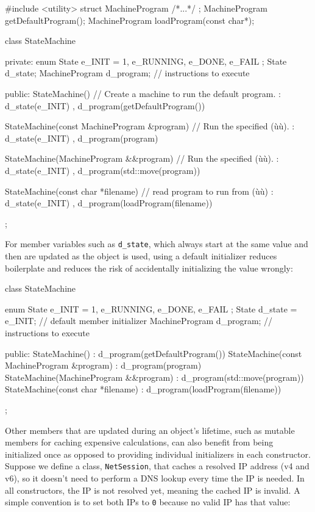 \begin{emcppshiddenlisting}[emcppsbatch={e3,e4}]
#include <utility>
struct MachineProgram { /*...*/ };
MachineProgram getDefaultProgram();
MachineProgram loadProgram(const char*);
\end{emcppshiddenlisting}
\begin{emcppslisting}[emcppsbatch=e3]
class StateMachine
{
private:
    enum State { e_INIT = 1, e_RUNNING, e_DONE, e_FAIL };
    State          d_state;
    MachineProgram d_program;  // instructions to execute

public:
    StateMachine()  // Create a machine to run the default program.
    : d_state(e_INIT)
    , d_program(getDefaultProgram())
    { }

    StateMachine(const MachineProgram &program)  // Run the specified (ù{}ù).
    : d_state(e_INIT)
    , d_program(program)
    { }

    StateMachine(MachineProgram &&program)  // Run the specified (ù{}ù).
    : d_state(e_INIT)
    , d_program(std::move(program))
    { }

    StateMachine(const char *filename)  // read program to run from (ù{}ù)
    : d_state(e_INIT)
    , d_program(loadProgram(filename))
    { }
};
\end{emcppslisting}
    

For member variables such as \lstinline!d_state!, which always start at
the same value and then are updated as the object is used, using a
default initializer reduces boilerplate and reduces the risk of
accidentally initializing the value wrongly:

\begin{emcppslisting}[emcppsbatch=e4]
class StateMachine
{
    enum State { e_INIT = 1, e_RUNNING, e_DONE, e_FAIL };
    State          d_state = e_INIT;  // default member initializer
    MachineProgram d_program;         // instructions to execute

public:
    StateMachine() : d_program(getDefaultProgram()) { }
    StateMachine(const MachineProgram &program) : d_program(program) { }
    StateMachine(MachineProgram &&program) : d_program(std::move(program)) { }
    StateMachine(const char *filename) : d_program(loadProgram(filename)) { }
};
\end{emcppslisting}
    

Other members that are updated during an object's lifetime, such as
mutable members for caching expensive calculations, can also benefit
from being initialized once as opposed to providing individual
initializers in each constructor. Suppose we define a class,
\lstinline!NetSession!, that caches a resolved IP address (v4 and v6), so
it doesn't need to perform a DNS lookup every time the IP is needed. In
all constructors, the IP is not resolved yet, meaning the cached IP is
invalid. A simple convention is to set both IPs to \lstinline!0! because no
valid IP has that value:

